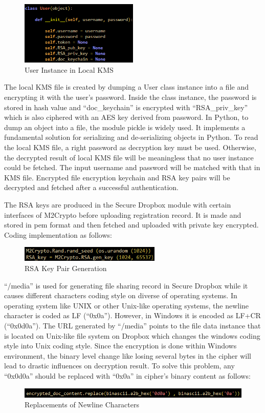 \begin{figure}[h]
        \centering
        \includegraphics[width=0.5\textwidth]{figures/User_Instance_Stored_in_Ini_File.png}
        \caption[User Instance in Local KMS] {User Instance in Local KMS}
\end{figure}

The local KMS file is created by dumping a User class instance into a file and encrypting it with the user’s password. Inside the class instance, the password is stored in hash value and ``doc\_keychain'' is encrypted with ``RSA\_priv\_key'' which is also ciphered with an AES key derived from password. In Python, to dump an object into a file, the module pickle is widely used. It implements a fundamental solution for serializing and de-serializing objects in Python. To read the local KMS file, a right password as decryption key must be used. Otherwise, the decrypted result of local KMS file will be meaningless that no user instance could be fetched. The input username and password will be matched with that in KMS file. Encrypted file encryption keychain and RSA key pairs will be decrypted and fetched after a successful authentication.

The RSA keys are produced in the Secure Dropbox module with certain interfaces of M2Crypto before uploading registration record. It is made and stored in pem format and then fetched and uploaded with private key encrypted. Coding implementation as follows:

\begin{figure}[h]
        \centering
        \includegraphics[width=0.6\textwidth]{figures/RSA_Key_Pair_Generation.png}
        \caption[RSA Key Pair Generation] {RSA Key Pair Generation}
\end{figure}

``/media'' is used for generating file sharing record in Secure Dropbox while it causes different characters coding style on diverse of operating systems. In operating system like UNIX or other Unix-like operating systems, the newline character is coded as LF (``0x0a''). However, in Windows it is encoded as LF+CR (``0x0d0a''). The URL generated by ``/media'' points to the file data instance that is located on Unix-like file system on Dropbox which changes the windows coding style into Unix coding style. Since the encryption is done within Windows environment, the binary level change like losing several bytes in the cipher will lead to drastic influences on decryption result. To solve this problem, any ``0x0d0a'' should be replaced with ``0x0a'' in cipher’s binary content as follows:

\begin{figure}[h]
        \centering
        \includegraphics[width=1.0\textwidth]{figures/Replacements_of_Newline_Characters.png}
        \caption[Replacements of Newline Characters] {Replacements of Newline Characters}
\end{figure}
